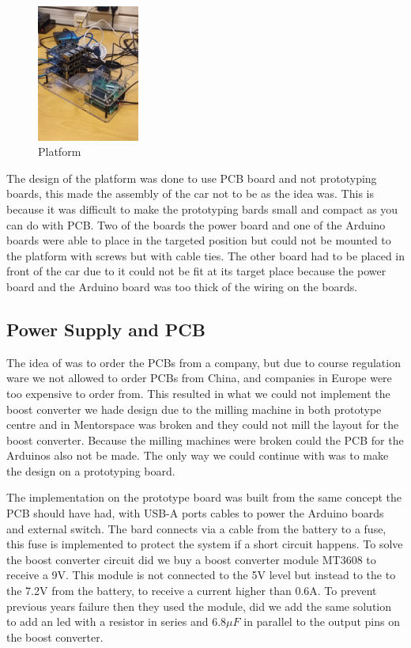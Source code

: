 \documentclass[11pt, titlepage]{article} %
\begin{document}
\begin{figure}
	\includegraphics[width=0.3\textwidth]{platform_assembely.jpg}
	\caption{Platform}
	\label{fig:platform_ass}
\end{figure}

The design of the platform was done to use PCB board and not prototyping boards, this made the assembly of the car not to be as the idea was. This is because it was difficult to make the prototyping bards small and compact as you can do with PCB. Two of the boards the power board and one of the Arduino boards were able to place in the targeted position but could not be mounted to the platform with screws but with cable ties. The other board had to be placed in front of the car due to it could not be fit at its target place because the power board and the Arduino board was too thick of the wiring on the boards. 
 

\subsection{Power Supply and PCB}

The idea of was to order the PCBs from a company, but due to course regulation ware we not allowed to order PCBs from China, and companies in Europe were too expensive to order from. This resulted in what we could not implement the boost converter we hade design due to the milling machine in both prototype centre and in Mentorspace was broken and they could not mill the layout for the boost converter. Because the milling machines were broken could the PCB for the Arduinos also not be made. The only way we could continue with was to make the design on a prototyping board. 

The implementation on the prototype board was built from the same concept the PCB should have had, with USB-A ports cables to power the Arduino boards and external switch. The bard connects via a cable from the battery to a fuse, this fuse is implemented to protect the system if a short circuit happens. To solve the boost converter circuit did we buy a boost converter module MT3608 to receive a 9V. This module is not connected to the 5V level but instead to the to the 7.2V from the battery, to receive a current higher than 0.6A. To prevent previous years failure then they used the module, did we add the same solution to add an led with a resistor in series and $ 6.8\mu F$ in parallel to the output pins on the boost converter.
\end{document}
